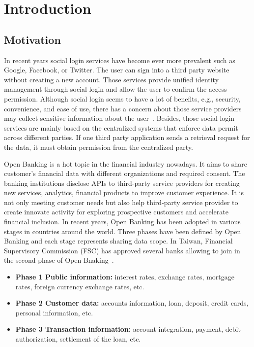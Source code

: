 \chapter{Introduction}
\label{chapter:intro}
\section{Motivation}
In recent years social login services have become ever more prevalent such as Google, Facebook, or Twitter. The user can sign into a third party website without creating a new account. Those services provide unified identity management through social login and allow the user to confirm the access permission. Although social login seems to have a lot of benefits, e.g., security, convenience, and ease of use, there has a concern about those service providers may collect sensitive information about the user~\cite{gafni2014social}.
Besides, those social login services are mainly based on the centralized systems that enforce data permit across different parties. If one third party application sends a retrieval request for the data, it must obtain permission from the centralized party.\par
Open Banking is a hot topic in the financial industry nowadays. It aims to share customer's financial data with different organizations and required consent. The banking institutions disclose APIs to third-party service providers for creating new services, analytics, financial products to improve customer experience. It is not only meeting customer needs but also help third-party service provider to create innovate activity for exploring prospective customers and accelerate financial inclusion. In recent years, Open Banking has been adopted in various stages in countries around the world. Three phases have been defined by Open Banking and each stage represents sharing data scope. In Taiwan, Financial Supervisory Commission (FSC) has approved several banks allowing to join in the second phase of Open Bnaking~\cite{thepaypers_2021}.\par

\begin{itemize}[noitemsep]
    \item \textbf{Phase 1 Public information:} interest rates, exchange rates, mortgage rates, foreign currency exchange rates, etc.
    \item \textbf{Phase 2 Customer data:} accounts information, loan, deposit, credit cards, personal information, etc.
    \item \textbf{Phase 3 Transaction information:} account integration, payment, debit authorization, settlement of the loan, etc.
\end{itemize}\par

